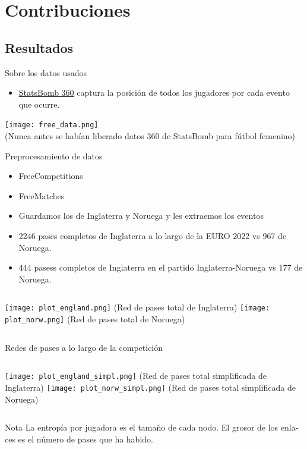\documentclass{beamer}
\begin{document}
\section{Contribuciones}

\subsection{Resultados}

\begin{frame}{Sobre los datos usados}
	\begin{itemize}
		\item \href{https://statsbomb.com/articles/soccer/statsbomb-release-free-360-data-womens-euro-2022-available-now/}{StatsBomb 360}
		captura la posición de todos los jugadores por cada evento que ocurre.
	\end{itemize}
	\begin{center}
		\texttt{[image: free\_data.png]}
		\\
		\footnotesize(Nunca antes se habían liberado datos 360 de StatsBomb para fútbol femenino)
    \end{center}
\end{frame}

\begin{frame}{Preprocesamiento de datos}
	\begin{itemize}
		\item FreeCompetitions
		\item FreeMatches
		\item Guardamos los de Inglaterra y Noruega y les extraemos los eventos
		\item 2246 pases completos de Inglaterra a lo largo de la EURO 2022 vs 967 de Noruega.
		\item 444 pasess completos de Inglaterra en el partido Inglaterra-Noruega vs 177 de Noruega.
	\end{itemize}
	\begin{columns}[t]
		\texttt{[image: plot\_england.png]}
		\footnotesize(Red de pases total de Inglaterra)
		\texttt{[image: plot\_norw.png]}
		\footnotesize(Red de pases total de Noruega)
	\end{columns} 
\end{frame}

\begin{frame}{Redes de pases a lo largo de la competición}
    \begin{columns}[t]
        \texttt{[image: plot\_england\_simpl.png]}
        \footnotesize(Red de pases total simplificada de Inglaterra)
        \texttt{[image: plot\_norw\_simpl.png]}
        \footnotesize(Red de pases total simplificada de Noruega)
    \end{columns} 
	\begin{alertblock}{Nota}
		\textlatin{La entropía por jugadora es el tamaño de cada nodo. El grosor de los enlaces es el 
	 	número de pases que ha habido.}
	\end{alertblock}
\end{frame}
\end{document}
